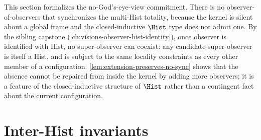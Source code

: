 \begin{remark}
\label{rem:no-gods-eye}
This section formalizes the no-God's-eye-view commitment. There is no observer-of-observers that synchronizes the multi-Hist totality, because the kernel is silent about a global frame and the closed-inductive \(\Hist\) type does not admit one. By the sibling capstone (\autoref{ch:visions-observer-hist-identity}), once observer is identified with Hist, no super-observer can coexist: any candidate super-observer is itself a Hist, and is subject to the same locality constraints as every other member of a configuration. \autoref{lem:extension-preserves-no-sync} shows that the absence cannot be repaired from inside the kernel by adding more observers; it is a feature of the closed-inductive structure of \(\Hist\) rather than a contingent fact about the current configuration.
\end{remark}

\section{Inter-Hist invariants}
\label{sec:inter-hist-invariants}

